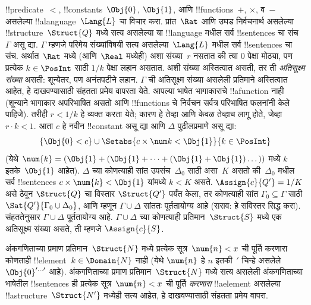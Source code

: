\documentclass[../../../include/open-logic-section]{subfiles}
\begin{document}
{\begin{ex}
!!{predicate}~$<$, !!{constant}s~$\Obj{0}$, $\Obj{1}$, आणि
!!{function}s~$+$, $\times$, व~$-$ असलेल्या !!a{language}~$\Lang{L}$ चा
विचार करा. प्रांत~$\Rat$ आणि उघड निर्वचनार्थ असलेल्या
!!{structure}~$\Struct{Q}$ मध्ये सत्य असलेल्या या !!{language} मधील सर्व
!!{sentence}s चा संच~$\Gamma$ असू द्या. $\Gamma$ म्हणजे परिमेय
संख्यांविषयी सत्य असलेल्या~$\Lang{L}$ मधील सर्व !!{sentence}s चा संच.
अर्थात~$\Rat$ मध्ये (आणि~$\Real$ मध्येही) अशा संख्या~$r$ नसतात की त्या
$0$ पेक्षा मोठ्या, पण प्रत्येक $k \in \PosInt$ साठी $1/k$ पेक्षा लहान
असतात. अशी संख्या अस्तित्वात असती, तर ती \emph{अतिसूक्ष्म संख्या} असती:
शून्येतर, पण अनंतपटीने लहान. $\Gamma$ ची अतिसूक्ष्म संख्या असलेली प्रतिमाने
अस्तित्वात आहेत, हे दाखवण्यासाठी संहतता प्रमेय वापरता येते. आपल्या भाषेत
भागाकाराचे !!a{function} नाही (शून्याने भागाकार अपरिभाषित असतो आणि
!!{function}s चे निर्वचन सर्वत्र परिभाषित फलनांनी केले पाहिजे). तरीही
$r < 1/k$ हे व्यक्त करता येते; कारण हे तेव्हा आणि केवळ तेव्हाच लागू होते,
जेव्हा $r \cdot k < 1$. आता $c$ हे नवीन !!{constant} असू द्या आणि
$\Delta$ पुढीलप्रमाणे असू द्या:
\[
\{\Obj{0} < c\}
\cup \Setabs{ c \times \num k < \Obj{1} }{k \in \PosInt}
\]
(येथे $\num{k} = (\Obj{1} + (\Obj{1} + \dots + (\Obj{1} +
\Obj{1})\dots))$ मध्ये $k$ इतके~$\Obj{1}$ आहेत). $\Delta$ च्या कोणत्याही
सांत उपसंच~$\Delta_0$ साठी असा~$K$ असतो की~$\Delta_0$ मधील सर्व
!!{sentence}s $c \times \num{k} < \Obj{1}$ यांमध्ये $k < K$ असते.
$\Assign{c}{Q'} = 1/K$ असे ठेवून $\Struct{Q}$ चा विस्तार
$\Struct{Q'}$ पर्यंत केला, तर कोणत्याही सांत $\Gamma_0 \subseteq \Gamma$
साठी $\Sat{Q'}{\Gamma_0 \cup \Delta_0}$, आणि म्हणून $\Gamma \cup \Delta$
सांततः पूर्ततायोग्य आहे (सराव: हे सविस्तर सिद्ध करा). संहततेनुसार
$\Gamma \cup \Delta$ पूर्ततायोग्य आहे. $\Gamma \cup \Delta$ च्या
कोणत्याही प्रतिमान~$\Struct{S}$ मध्ये एक अतिसूक्ष्म संख्या असते, ती म्हणजे
$\Assign{c}{S}$.
\end{ex}
}{}

\begin{prob}
अंकगणिताच्या प्रमाण प्रतिमान~$\Struct{N}$ मध्ये प्रत्येक सूत्र~$\num{n}
< x$ ची पूर्ति करणारा कोणताही !!{element}~$k \in \Domain{N}$ नाही
(येथे $\num{n}$ हे $n$ इतकी~$\prime$ चिन्हे असलेले
$\Obj{0}^{\prime\dots\prime}$ आहे). अंकगणिताच्या प्रमाण
प्रतिमान~$\Struct{N}$ मध्ये सत्य असलेली अंकगणिताच्या भाषेतील
!!{sentence}s ही प्रत्येक सूत्र~$\num{n} < x$ ची पूर्ति \emph{करणारा}
!!a{element} असलेल्या !!a{structure}~$\Struct{N'}$ मध्येही सत्य आहेत,
हे दाखवण्यासाठी संहतता प्रमेय वापरा.
\end{prob}
\tagendprob
\end{document}
